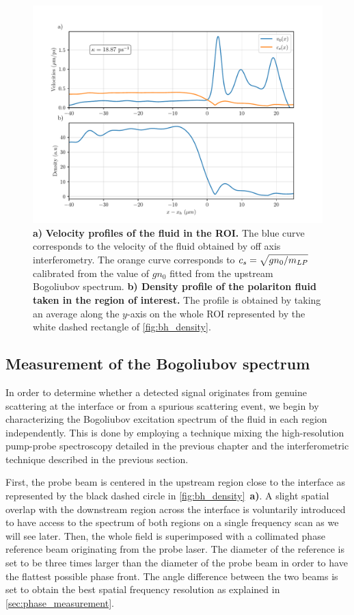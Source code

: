 \begin{figure}
    \centering
    \includegraphics[width=1\textwidth]{chap_stimulated_hawking/fig/bh_balistic.pdf}
    \caption{\textbf{a)} \textbf{Velocity profiles of the fluid in the ROI.} The blue curve corresponds to the velocity of the fluid obtained by off axis interferometry. The orange
    curve corresponds to $c_s=\sqrt{gn_0/m_{LP}}$ calibrated from the value of $gn_0$ fitted from the upstream Bogoliubov spectrum. \textbf{b) Density profile of the polariton fluid taken in the region of interest.} The profile is obtained by taking an
    average along the $y$-axis on the whole ROI represented by the white dashed rectangle of \autoref{fig:bh_density}. }
    \label{fig:bh_balistic}
\end{figure}

\subsection{Measurement of the Bogoliubov spectrum}

In order to determine whether a detected signal originates from genuine scattering at the interface or from a spurious scattering event, we begin by characterizing the Bogoliubov excitation spectrum of the fluid in each region independently.
This is done by employing a technique mixing the high-resolution pump-probe spectroscopy detailed in the previous chapter and the interferometric technique described in the previous section.

\bigskip

First, the probe beam is centered in the upstream region close to the interface as represented by the black dashed circle in \autoref{fig:bh_density}~\textbf{a)}.
A slight spatial overlap with the downstream region across the interface is voluntarily introduced to have access to the spectrum of both regions on a single frequency scan as we will see later. 
Then, the whole field is superimposed with a collimated phase reference beam originating from the probe laser. The diameter of the reference is set to be three times larger than the diameter of the probe beam in order to have the flattest possible phase front.
 The angle difference between the two beams is set to obtain the best spatial frequency resolution as explained in \autoref{sec:phase_measurement}.


